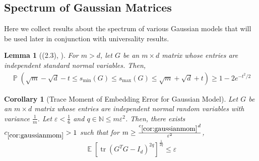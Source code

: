 \documentclass[11pt]{amsart}
\numberwithin{equation}{section}
\numberwithin{equation}{section}
\DeclareMathOperator{\E}{\mathbb{E}}
\DeclareMathOperator{\Pb}{\mathbb{P}}
\DeclareMathOperator*{\tr}{tr}
\newtheorem{corollary}[theorem]{Corollary}
\newtheorem{lemma}[theorem]{Lemma}
\theoremstyle{remark}
\theoremstyle{definition}
\begin{document}
\subsection{Spectrum of Gaussian Matrices}
Here we collect results about the spectrum of various Gaussian models that will be used later in conjunction with universality results.



   \begin{lemma}[(2.3), \cite{rudelson2010non}]\label{lem:Gaussianspectrum}
    For $m>d$, let $G$ be an $m \times d$ matrix whose entries are independent standard normal variables. Then,
    \begin{align*}
        \Pb(\sqrt{m}-\sqrt{d}-t \leq s_{\min}(G) \leq s_{\max}(G) \leq \sqrt{m}+\sqrt{d}+t) \geq 1 - 2e^{-t^2/2}
    \end{align*}
\end{lemma}

\begin{corollary}[Trace Moment of Embedding Error for Gaussian Model] \label{cor:gaussianmom}
    Let $G$ be an $m \times d$ matrix whose entries are independent normal random variables with variance $\frac{1}{m}$. Let $\varepsilon<\frac{1}{6}$ and $q \in \mathbb{N} \le m \varepsilon^2 $. Then, there exists $c_{\ref*{cor:gaussianmom}} > 1$ such that for $m \geq \frac{c_{\ref*{cor:gaussianmom}}d}{\varepsilon^2}$,
    \[ \E[\tr(G^TG - I_d)^{2q}]^\frac{1}{2q} \leq  \varepsilon \]
    
\end{corollary}
\end{document}
